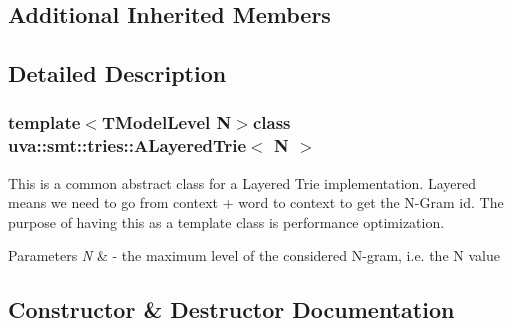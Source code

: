 \subsection*{Additional Inherited Members}


\subsection{Detailed Description}
\subsubsection*{template$<$T\+Model\+Level N$>$class uva\+::smt\+::tries\+::\+A\+Layered\+Trie$<$ N $>$}

This is a common abstract class for a Layered Trie implementation. Layered means we need to go from context + word to context to get the N-\/\+Gram id. The purpose of having this as a template class is performance optimization. 
\begin{DoxyParams}{Parameters}
{\em N} & -\/ the maximum level of the considered N-\/gram, i.\+e. the N value \\
\hline
\end{DoxyParams}


\subsection{Constructor \& Destructor Documentation}
\hypertarget{classuva_1_1smt_1_1tries_1_1_a_layered_trie_a27adf0c1d1bf1497d7205f172285b46d}{}
